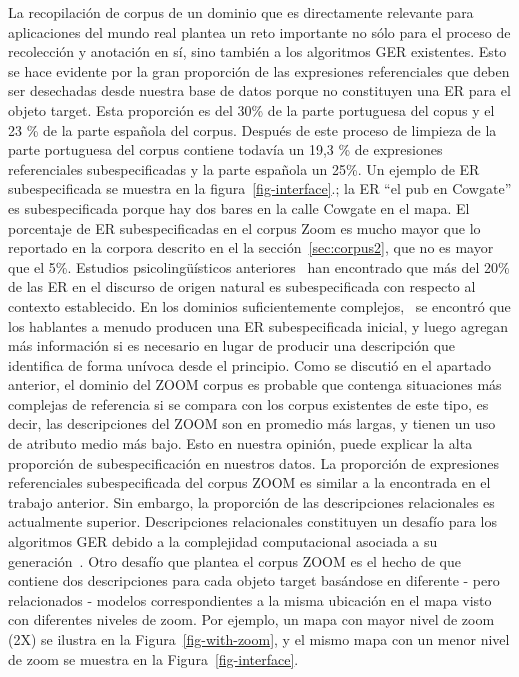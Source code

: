 La recopilaci\'on de corpus de un dominio que es directamente relevante para aplicaciones del mundo real plantea un reto importante no s\'olo para el proceso de recolecci\'on y anotaci\'on en s\'{i}, sino tambi\'en a los algoritmos GER existentes. Esto se hace evidente por la gran proporci\'on de las expresiones referenciales que deben ser desechadas desde nuestra base de datos porque no constituyen una ER para el objeto target. Esta proporci\'on es del 30\% de la parte portuguesa del copus y el 23 \% de la parte espa\~nola del corpus.
Despu\'es de este proceso de limpieza de la parte portuguesa del corpus contiene todav\'{i}a un 19,3 \% de expresiones referenciales subespecificadas y la parte espa\~nola un 25\%. Un ejemplo de ER subespecificada se muestra en la figura~\ref{fig-interface}.; la ER ``el pub en Cowgate'' es subespecificada porque hay dos bares en la calle Cowgate en el mapa. El porcentaje de ER subespecificadas en el corpus Zoom es mucho mayor que lo reportado en la corpora descrito en el la secci\'on~\ref{sec:corpus2}, que no es mayor que el 5\%. Estudios psicoling\"u\'{i}sticos anteriores~\cite{Clark1986} han encontrado que m\'as del 20\% de las ER en el discurso de origen natural es subespecificada con respecto al contexto establecido. En los dominios suficientemente complejos,~\cite{Clark1986} se encontr\'o que los hablantes a menudo producen una ER subespecificada inicial, y luego agregan m\'as informaci\'on si es necesario en lugar de producir una descripci\'on que identifica de forma un\'{i}voca desde el principio. Como se discuti\'o en el apartado anterior, el dominio del ZOOM corpus es probable que contenga situaciones m\'as complejas de referencia si se compara con los corpus existentes de este tipo, es decir, las descripciones del ZOOM son en promedio m\'as largas, y tienen un uso de atributo medio m\'as bajo. Esto en nuestra opini\'on, puede explicar la alta proporci\'on de subespecificaci\'on en nuestros datos.
La proporci\'on de expresiones referenciales subespecificada del corpus ZOOM es similar a la encontrada en el trabajo anterior. Sin embargo, la proporci\'on de las descripciones relacionales es actualmente superior. Descripciones relacionales constituyen un desaf\'{i}o para los algoritmos GER debido a la complejidad computacional asociada a su generaci\'on~\cite{survey}. Otro desaf\'{i}o que plantea el corpus ZOOM es el hecho de que contiene dos descripciones para cada objeto target bas\'andose en diferente - pero relacionados - modelos correspondientes a la misma ubicaci\'on en el mapa visto con diferentes niveles de zoom. Por ejemplo, un mapa con mayor nivel de zoom (2X) se ilustra en la Figura~\ref{fig-with-zoom}, y el mismo mapa con un menor nivel de zoom se muestra en la Figura~\ref{fig-interface}.

